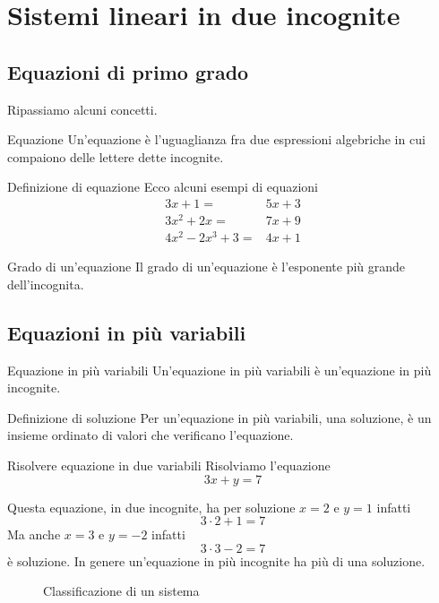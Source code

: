 \chapter{Sistemi lineari in due incognite}
\label{sec:sistemiLineariInDueIncognite}
\section{Equazioni di primo grado}
Ripassiamo alcuni concetti.
\begin{definizionet}{Equazione}{}
	Un'equazione è l'uguaglianza fra due espressioni algebriche in cui 
	compaiono delle lettere dette incognite.
\end{definizionet}
\begin{esempiot}{Definizione di equazione}{}
Ecco alcuni esempi di equazioni
\begin{align*}
3x+1=&5x+3\\
3x^2+2x=&7x+9\\
4x^2-2x^3+3=&4x+1
\end{align*}
\end{esempiot}
\begin{definizionet}{Grado di un'equazione}{}
	Il grado di un'equazione è l'esponente più grande dell'incognita.
\end{definizionet}
\section{Equazioni in più variabili}
\label{sec:EquazioniInPiuVariabili}
\begin{definizionet}{Equazione in più variabili}{}
	Un'equazione in più variabili è un'equazione in più incognite.
\end{definizionet}
\begin{definizionet}{Definizione di soluzione}{}
Per un'equazione in più variabili, una soluzione, è un insieme ordinato di valori che verificano l'equazione.
\end{definizionet}
\begin{esempiot}{Risolvere equazione in due variabili}{}
	Risolviamo l'equazione\[ 3x+y=7\]
\end{esempiot}	
Questa equazione, in due incognite, ha per soluzione
$x=2$ e $y=1$ infatti \[3\cdot2+1=7\]
Ma anche $x=3$ e $y=-2$ infatti \[3\cdot3-2=7\] è soluzione.
In genere un'equazione in più incognite ha più di una soluzione.
\begin{figure}
	\centering

	\caption{Classificazione di un sistema}
	\label{fig:ClassificazioneDiUnSistema}
\end{figure}
